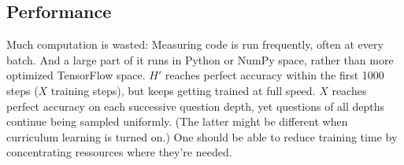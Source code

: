 \documentclass{farlamp}
\begin{document}
\subsection{Performance}

Much computation is wasted: Measuring code is run frequently, often at every
batch. And a large part of it runs in Python or NumPy space, rather than more
optimized TensorFlow space. $H'$ reaches perfect accuracy within the first 1000
steps ($X$ training steps), but keeps getting trained at full speed. $X$ reaches
perfect accuracy on each successive question depth, yet questions of all depths
continue being sampled uniformly. (The latter might be different when curriculum
learning is turned on.) One should be able to reduce training time by
concentrating ressources where they're needed.
\end{document}
